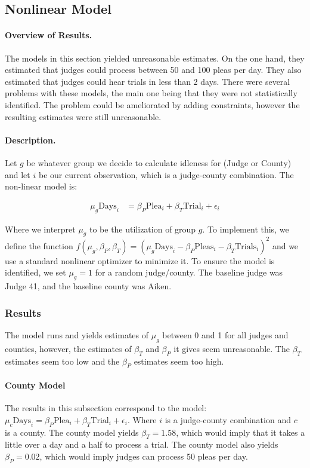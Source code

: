 \documentclass[11pt, oneside]{article}   	%
\theoremstyle{ModifiedStyle}
\begin{document}
	\subsection{Nonlinear Model}
	  \paragraph{Overview of Results.} The models in this section yielded unreasonable estimates. On the one hand, they estimated that judges could process between 50 and 100 pleas per day. They also estimated that judges could hear trials in less than 2 days. There were several problems with these models, the main one being that they were not statistically identified. The problem could be ameliorated by adding constraints, however the resulting estimates were still unreasonable.


		\paragraph{Description.} Let $g$ be whatever group we decide to calculate idleness for (Judge or County) and let $i$ be our current observation, which is a judge-county combination. The non-linear model is:

		\begin{align*}
			\mu_g \text{Days}_i &= \beta_P \text{Plea}_i + \beta_T \text{Trial}_i + \epsilon_i
		\end{align*}

		Where we interpret $\mu_g$ to be the utilization of group $g$. To implement this, we define the function $f(\mu_g,\beta_P,\beta_T) = (\mu_g \text{Days}_i - \beta_P \text{Pleas}_i - \beta_T \text{Trials}_i)^2$ and we use a standard nonlinear optimizer to minimize it. To ensure the model is identified, we set $\mu_g=1$ for a random judge/county. The baseline judge was Judge 41, and the baseline county was Aiken.

		\subsubsection{Results}
		  The model runs and yields estimates of $\mu_g$ between 0 and 1 for all judges and counties, however, the estimates of $\beta_T$ and $\beta_P$ it gives seem unreasonable. The $\beta_T$ estimates seem too low and the $\beta_P$ estimates seem too high.

		  \paragraph{County Model}
		    The results in this subsection correspond to the model: $\mu_c \text{Days}_i = \beta_P \text{Plea}_i + \beta_T \text{Trial}_i + \epsilon_i$. Where $i$ is a judge-county combination and $c$ is a county. The county model yields $\beta_T=1.58$, which would imply that it takes a little over a day and a half to process a trial. The county model also yields $\beta_P=0.02$, which would imply judges can process 50 pleas per day.
\end{document}
